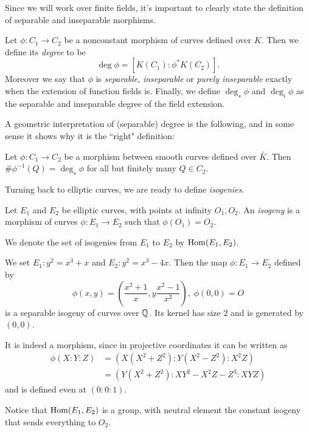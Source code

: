 Since we will work over finite fields, it's important to clearly state the definition of separable and inseparable morphisms.

\begin{definition}
    Let $\phi:C_1\to C_2$ be a nonconstant morphism of curves defined over $K$. Then we define its \emph{degree} to be $$\deg\phi = [K(C_1):\phi^\ast K(C_2)].$$
    Moreover we say that $\phi$ is \emph{separable}, \emph{inseparable} or \emph{purely inseparable} exactly when the extension of function fields is. Finally, we define $\deg_s\phi$ and $\deg_i\phi$ as the separable and inseparable degree of the field extension.
\end{definition}

A geometric interpretation of (separable) degree is the following, and in some sense it shows why it is the ``right" definition:

\begin{proposition}
    Let $\phi: C_1\to C_2$ be a morphism between smooth curves defined over $\bar K$. Then $\#\phi^{-1}(Q)=\deg_s\phi$ for all but finitely many $Q\in C_2$.
\end{proposition}

Turning back to elliptic curves, we are ready to define \emph{isogenies}.
\begin{definition}
    Let $E_1$ and $E_2$ be elliptic curves, with points at infinity $O_1,O_2$. An \emph{isogeny} is a morphism of curves $\phi:E_1\to E_2$ such that $\phi(O_1)=O_2$.
    
    We denote the set of isogenies from $E_1$ to $E_2$ by $\operatorname{Hom}(E_1, E_2)$.
\end{definition}

\begin{example}
    We set $E_1:y^2=x^3+x$ and $E_2:y^2=x^3-4x$. Then the map $\phi:E_1\to E_2$ defined by $$\phi(x,y)=\left(\frac{x^2+1}{x}, y\frac{x^2-1}{x^2}\right), \;\phi(0,0)=O$$ is a separable isogeny of curves over $\mathbb{Q}$. Its kernel has size $2$ and is generated by $(0,0)$.
    
    It is indeed a morphism, since in projective coordinates it can be written as
    \begin{align*}
    \phi(X:Y:Z) &= (X(X^2+Z^2):Y(X^2-Z^2):X^2Z)\\
    &= (Y(X^2+Z^2):XY^2-X^2Z-Z^3:XYZ)
    \end{align*}
    and is defined even at $(0:0:1)$.
\end{example}

Notice that $\operatorname{Hom}(E_1, E_2)$ is a group, with neutral element the constant isogeny that sends everything to $O_2$.


